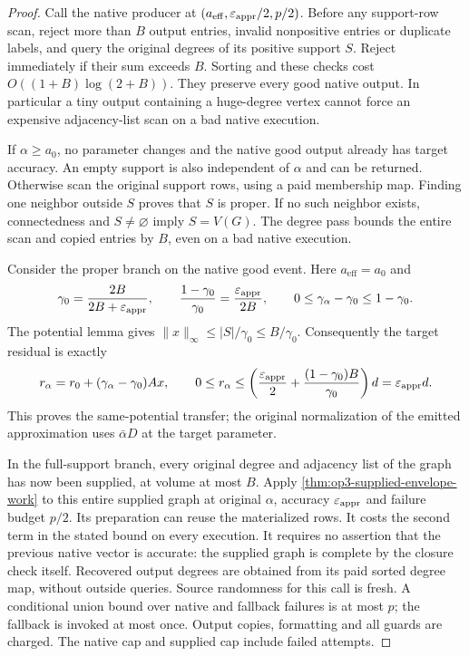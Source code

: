 \begin{proof}
Call the native producer at $(a_{\mathrm{eff}},\varepsilon_{\mathrm{appr}}/2,p/2)$.
Before any support-row scan, reject more than $B$ output entries,
invalid nonpositive entries or duplicate labels, and query the original
degrees of its positive support $S$. Reject immediately if their sum
exceeds $B$. Sorting and these checks cost
$O((1+B)\log(2+B))$. They preserve every good native output.
In particular a tiny output containing a huge-degree vertex cannot
force an expensive adjacency-list scan on a bad native execution.

If $\alpha\geq a_0$, no parameter changes and the native good output
already has target accuracy. An empty support is also independent of
$\alpha$ and can be returned. Otherwise scan the original support rows,
using a paid membership map. Finding one neighbor outside $S$ proves
that $S$ is proper. If no such neighbor exists, connectedness and
$S\ne\varnothing$ imply $S=V(G)$. The degree pass bounds the entire
scan and copied entries by $B$, even on a bad native execution.

Consider the proper branch on the native good event. Here
$a_{\mathrm{eff}}=a_0$ and
\[
 \gamma_0=\frac{2B}{2B+\varepsilon_{\mathrm{appr}}},\qquad
 \frac{1-\gamma_0}{\gamma_0}=\frac{\varepsilon_{\mathrm{appr}}}{2B},\qquad
 0\leq\gamma_\alpha-\gamma_0\leq1-\gamma_0.
\]
The potential lemma gives $\|x\|_\infty\leq |S|/\gamma_0
\leq B/\gamma_0$. Consequently the target residual is exactly
\[
 r_\alpha=r_0+(\gamma_\alpha-\gamma_0)Ax,
 \qquad
 0\leq r_\alpha
 \leq\left(\frac{\varepsilon_{\mathrm{appr}}}{2}
       +\frac{(1-\gamma_0)B}{\gamma_0}\right)d
 =\varepsilon_{\mathrm{appr}} d.
\]
This proves the same-potential transfer; the original normalization of
the emitted approximation uses $\bar\alpha D$ at the target parameter.

In the full-support branch, every original degree and adjacency list
of the graph has now been supplied, at volume at most $B$.
Apply \cref{thm:op3-supplied-envelope-work} to this entire supplied
graph at original $\alpha$, accuracy $\varepsilon_{\mathrm{appr}}$ and failure budget
$p/2$. Its preparation can reuse the materialized rows. It costs the
second term in the stated bound on every execution. It requires no
assertion that the previous native vector is accurate: the supplied
graph is complete by the closure check itself. Recovered output degrees
are obtained from its paid sorted degree map, without outside queries.
Source randomness for this call is fresh. A conditional union bound
over native and fallback failures is at most $p$; the fallback is
invoked at most once. Output copies, formatting and all guards are
charged. The native cap and supplied cap include failed attempts.
\end{proof}


